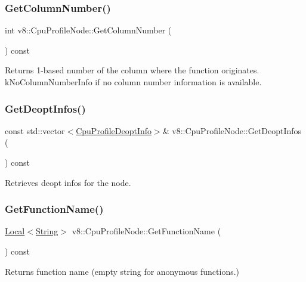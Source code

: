 \subsubsection{\texorpdfstring{Get\+Column\+Number()}{GetColumnNumber()}}
{\footnotesize\ttfamily int v8\+::\+Cpu\+Profile\+Node\+::\+Get\+Column\+Number (\begin{DoxyParamCaption}{ }\end{DoxyParamCaption}) const}

Returns 1-\/based number of the column where the function originates. k\+No\+Column\+Number\+Info if no column number information is available. \mbox{\label{classv8_1_1CpuProfileNode_ade83e1a3fef2404d0d2d1289aad4ddd9}} 
\subsubsection{\texorpdfstring{Get\+Deopt\+Infos()}{GetDeoptInfos()}}
{\footnotesize\ttfamily const std\+::vector$<$\mbox{\hyperlink{structv8_1_1CpuProfileDeoptInfo}{Cpu\+Profile\+Deopt\+Info}}$>$\& v8\+::\+Cpu\+Profile\+Node\+::\+Get\+Deopt\+Infos (\begin{DoxyParamCaption}{ }\end{DoxyParamCaption}) const}

Retrieves deopt infos for the node. \mbox{\label{classv8_1_1CpuProfileNode_addacb8c9ca25fb14450f1bcf3c0ef4de}} 
\subsubsection{\texorpdfstring{Get\+Function\+Name()}{GetFunctionName()}}
{\footnotesize\ttfamily \mbox{\hyperlink{classv8_1_1Local}{Local}}$<$\mbox{\hyperlink{classv8_1_1String}{String}}$>$ v8\+::\+Cpu\+Profile\+Node\+::\+Get\+Function\+Name (\begin{DoxyParamCaption}{ }\end{DoxyParamCaption}) const}

Returns function name (empty string for anonymous functions.) \mbox{\label{classv8_1_1CpuProfileNode_a8c6b47ccf397aed8f0454d9c6a4f05e2}} 
